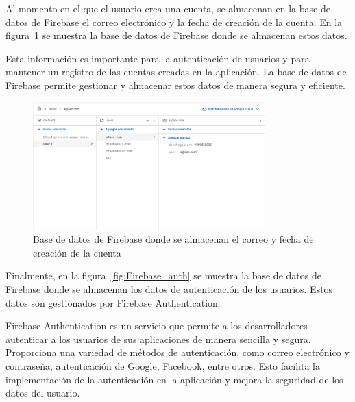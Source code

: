     Al momento en el que el usuario crea una cuenta, se almacenan en la base de datos de Firebase el correo electrónico y la fecha de creación de la cuenta. En la figura~\ref{fig:Firebase_BD_Usuarios} se muestra la base de datos de Firebase donde se almacenan estos datos.

    Esta información es importante para la autenticación de usuarios y para mantener un registro de las cuentas creadas en la aplicación. La base de datos de Firebase permite gestionar y almacenar estos datos de manera segura y eficiente.

    \begin{figure}[H]
        \centering
        \includegraphics[width=0.8\textwidth]{img/Resultados/firebase_BD_users.png}
        \caption[Base de datos de Firebase donde se almacenan el correo y fecha de creación de la cuenta.]{Base de datos de Firebase donde se almacenan el correo y fecha de creación de la cuenta\footnotemark}
        \label{fig:Firebase_BD_Usuarios}
    \end{figure}

    Finalmente, en la figura~\ref{fig:Firebase_auth} se muestra la base de datos de Firebase donde se almacenan los datos de autenticación de los usuarios. Estos datos son gestionados por Firebase Authentication.

    Firebase Authentication es un servicio que permite a los desarrolladores autenticar a los usuarios de sus aplicaciones de manera sencilla y segura. Proporciona una variedad de métodos de autenticación, como correo electrónico y contraseña, autenticación de Google, Facebook, entre otros. Esto facilita la implementación de la autenticación en la aplicación y mejora la seguridad de los datos del usuario.

